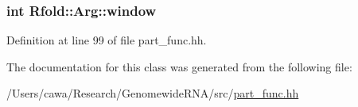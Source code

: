 \hypertarget{class_rfold_1_1_arg_abf6954c2deff613f191b1fae248389f3}{
\subsubsection[{window}]{\setlength{\rightskip}{0pt plus 5cm}int Rfold\+::\+Arg\+::window}}\label{class_rfold_1_1_arg_abf6954c2deff613f191b1fae248389f3}


Definition at line 99 of file part\+\_\+func.\+hh.



The documentation for this class was generated from the following file\+:\begin{DoxyCompactItemize}
\item 
/\+Users/cawa/\+Research/\+Genomewide\+R\+N\+A/src/\hyperlink{part__func_8hh}{part\+\_\+func.\+hh}\end{DoxyCompactItemize}
